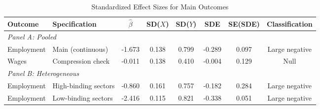\begin{table}[H]
\centering
\caption{Standardized Effect Sizes for Main Outcomes}
\label{tab:sde}
\begin{adjustbox}{max width=\textwidth}
\begin{threeparttable}
\begin{tabular}{llcccccc}
\toprule
Outcome & Specification & $\hat{\beta}$ & SD($X$) & SD($Y$) & SDE & SE(SDE) & Classification \\
\midrule
\multicolumn{8}{l}{\textit{Panel A: Pooled}} \\
Employment & Main (continuous) & -1.673 & 0.138 & 0.799 & -0.289 & 0.097 & Large negative \\
Wages & Compression check & -0.011 & 0.138 & 0.410 & -0.004 & 0.129 & Null \\
\midrule
\multicolumn{8}{l}{\textit{Panel B: Heterogeneous}} \\
Employment & High-binding sectors & -0.860 & 0.161 & 0.757 & -0.182 & 0.284 & Large negative \\
Employment & Low-binding sectors & -2.416 & 0.115 & 0.821 & -0.338 & 0.051 & Large negative \\
\bottomrule
\end{tabular}
\begin{tablenotes}[flushleft]
\footnotesize

\end{tablenotes}
\end{threeparttable}
\end{adjustbox}
\end{table}
